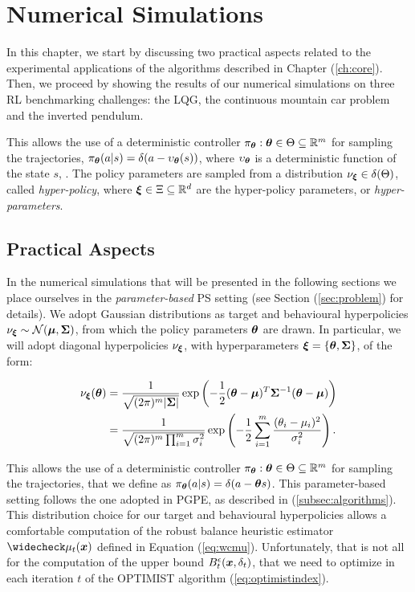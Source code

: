 
\chapter{Numerical Simulations} \label{ch:experiments}
In this chapter, we start by discussing two practical aspects related to the experimental applications of the algorithms described in Chapter (\ref{ch:core}). Then, we proceed by showing the results of our numerical simulations on three \gls{RL} benchmarking challenges: the \gls{LQG}, the continuous mountain car problem and the inverted pendulum.

This allows the use of a deterministic controller $\pi_{\boldsymbol{\theta}}: \boldsymbol{\theta}\in\Theta\subseteq\mathbb{R}^m$ for sampling the trajectories, \ie $\pi_{\boldsymbol{\theta}}(a|s)=\delta(a-\upsilon_{\boldsymbol{\theta}}(s))$, where $\upsilon_{\boldsymbol{\theta}}$ is a deterministic function of the state $s$, \eg \cite{sehnke2010parameter}. The policy parameters are sampled from a distribution $\nu_{\boldsymbol{\xi}}\in\delta(\Theta)$, called \emph{hyper-policy}, where $\boldsymbol{\xi}\in\Xi\subseteq\mathbb{R}^d$ are the hyper-policy parameters, or \emph{hyper-parameters}.

\section{Practical Aspects} \label{sec:practical}
In the numerical simulations that will be presented in the following sections we place ourselves in the \emph{parameter-based} \gls{PS} setting (see Section (\ref{sec:problem}) for details). We adopt Gaussian distributions as target and behavioural hyperpolicies $\nu_{\boldsymbol{\xi}}\sim \mathcal{N}(\boldsymbol{\mu},\boldsymbol{\Sigma})$, from which the policy parameters $\boldsymbol{\theta}$ are drawn. In particular, we will adopt diagonal hyperpolicies $\nu_{\boldsymbol{\xi}}$, with hyperparameters $\boldsymbol{\xi}=\{\boldsymbol{\theta},\boldsymbol{\Sigma}\}$, of the form: 

\begin{align}
\nu_{\boldsymbol{\xi}}(\boldsymbol{\theta}) & = \frac{1}{\sqrt{(2\pi)^m |\boldsymbol{\Sigma} |}}\exp\left(
	-\frac{1}{2} (\boldsymbol{\theta} - \boldsymbol{\mu} )^T\boldsymbol{\Sigma}^{-1}(\boldsymbol{\theta} - \boldsymbol{\mu} )\right)\\
	& = \frac{1}{\sqrt{(2\pi)^m \prod_{i=1}^{m} \sigma_{i}^2}}\exp\left(
	-\frac{1}{2} \sum\limits_{i=1}^m\frac{(\theta_{i}-\mu_{i})^2}{\sigma_{i}^2}\right).
\end{align}

This allows the use of a deterministic controller $\pi_{\boldsymbol{\theta}}: \boldsymbol{\theta}\in\Theta\subseteq\mathbb{R}^m$ for sampling the trajectories, that we define as $\pi_{\boldsymbol{\theta}}(a|s)=\delta(a-\boldsymbol{\theta} s)$. This parameter-based setting follows the one adopted in \gls{PGPE}, as described in (\ref{subsec:algorithms}). \\
This distribution choice for our target and behavioural hyperpolicies allows a comfortable computation of the robust balance heuristic estimator $\wc{\mu}_t(\vx)$ defined in Equation (\ref{eq:wcmu}). Unfortunately, that is not all for the computation of the upper bound $B_t^{\epsilon}(\boldsymbol{x},\delta_t)$, that we need to optimize in each iteration $t$ of the \gls{OPTIMIST} algorithm (\ref{eq:optimistindex}).

